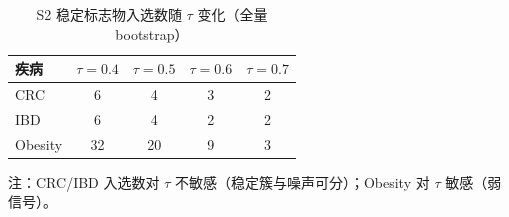 \begin{table}[htbp]
\centering
\caption{S2 稳定标志物入选数随 $\tau$ 变化（全量 bootstrap）}
\label{tab:s2-tau-sensitivity}
\small
\begin{tabular}{lcccc}
\toprule
疾病 & $\tau=0.4$ & $\tau=0.5$ & $\tau=0.6$ & $\tau=0.7$ \\
\midrule
CRC & 6 & 4 & 3 & 2 \\
IBD & 6 & 4 & 2 & 2 \\
Obesity & 32 & 20 & 9 & 3 \\
\bottomrule
\end{tabular}
\par\footnotesize
注：CRC/IBD 入选数对 $\tau$ 不敏感（稳定簇与噪声可分）；Obesity 对 $\tau$ 敏感（弱信号）。
\end{table}
